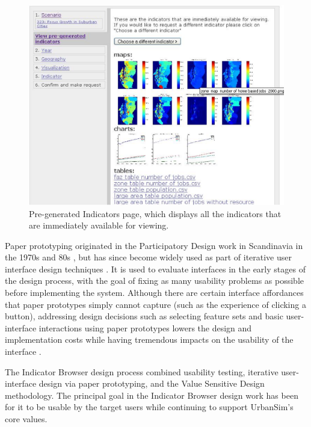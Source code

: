 \begin{figure}
\centering
\includegraphics[width=7in]{figs/pregenerated}

\caption{\label{fig:pregenerated} Pre-generated
Indicators page, which displays all the indicators that are immediately
available for viewing.}
\end{figure}

Paper prototyping originated in the Participatory Design work in
Scandinavia in the 1970s and 80s \cite{greenbaum-pd-1991}, but has since
become widely used as part of iterative user interface design techniques
\cite{rettig-cacm-1994}.  It is used to evaluate interfaces in the early
stages of the design process, with the goal of fixing as many usability
problems as possible before implementing the system. Although there are
certain interface affordances that paper prototypes simply cannot capture
(such as the experience of clicking a button), addressing design decisions
such as selecting feature sets and basic user-interface interactions using
paper prototypes lowers the design and implementation costs while having
tremendous impacts on the usability of the interface
\cite{nielsen-alertbox-paper-prototyping}.

The Indicator Browser design process combined usability testing,
iterative user-interface design via paper prototyping, and the Value
Sensitive Design methodology.  The principal goal in the Indicator Browser
design work has been for it to be usable by the target users
while continuing to support UrbanSim's core values.

